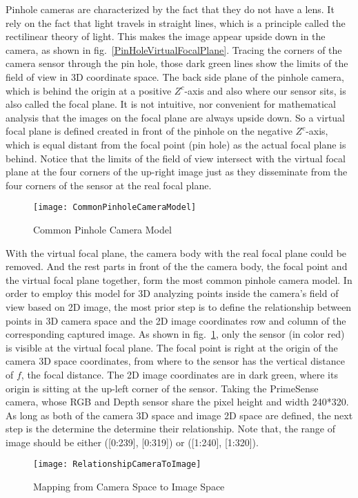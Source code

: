 %
%
Pinhole cameras are characterized by the fact that they do not have a lens. It rely on the fact that light travels in straight lines, which is a principle called the rectilinear theory of light. This makes the image appear upside down in the camera, as shown in fig.~\ref{PinHoleVirtualFocalPlane}. Tracing the corners of the camera sensor through the pin hole, those dark green lines show the limits of the field of view in 3D coordinate space. The back side plane of the pinhole camera, which is behind the origin at a positive \(Z^c\)-axis and also where our sensor sits, is also called the focal plane. It is not intuitive, nor convenient for mathematical analysis that the images on the focal plane are always upside down. So a virtual focal plane is defined created in front of the pinhole on the negative \(Z^c\)-axis, which is equal distant from the focal point (pin hole) as the actual focal plane is behind. Notice that the limits of the field of view intersect with the virtual focal plane at the four corners of the up-right image just as they disseminate from the four corners of the sensor at the real focal plane.

\begin{figure}[b]
\centering
\texttt{[image: CommonPinholeCameraModel]}
\caption{Common Pinhole Camera Model}
\label{CommonPinholeCameraModel}
\end{figure}%
%

With the virtual focal plane, the camera body with the real focal plane could be removed. And the rest parts in front of the the camera body, the focal point and the virtual focal plane together, form the most common pinhole camera model. In order to employ this model for 3D analyzing points inside the camera's field of view based on 2D image, the most prior step is to define the relationship between points in 3D camera space and the 2D image coordinates row and column of the corresponding captured image. As shown in fig.~\ref{CommonPinholeCameraModel}, only the sensor (in color red) is visible at the virtual focal plane. The focal point is right at the origin of the camera 3D space coordinates, from where to the sensor has the vertical distance of \(f\), the focal distance. The 2D image coordinates are in dark green, where its origin is sitting at the up-left corner of the sensor. Taking the PrimeSense camera, whose RGB and Depth sensor share the pixel height and width 240*320. As long as both of the camera 3D space and image 2D space are defined, the next step is the determine the determine their relationship. Note that, the range of image should be either ([0:239], [0:319]) or ([1:240], [1:320]).
%
\begin{figure}[b]
\centering
\texttt{[image: RelationshipCameraToImage]}
\caption{Mapping from Camera Space to Image Space}
\label{RelationshipCameraToImage}
\end{figure}%
%

